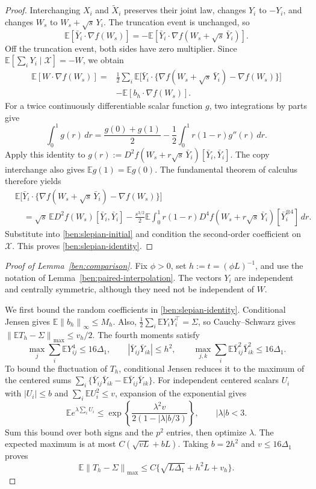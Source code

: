 \documentclass[11pt,letterpaper]{article}
\newenvironment{recovered}{\color{magenta}}{}
\theoremstyle{remark}
\newcommand{\E}{\mathbb E}
\newcommand{\norm}[1]{\left\lVert#1\right\rVert}
\begin{document}
\begin{recovered}
\begin{proof}
Interchanging \(X_i\) and \(\widetilde X_i\) preserves their joint
law, changes \(Y_i\) to \(-Y_i\), and changes \(W_s\) to
\(W_s+\sqrt s\,Y_i\). The truncation event is unchanged, so
\[
 \E[\bar Y_i\cdot\nabla f(W_s)]
 =-\E[\bar Y_i\cdot\nabla f(W_s+\sqrt s\,\bar Y_i)].
\]
Off the truncation event, both sides have zero multiplier. Since
\(\E[\sum_iY_i\mid\mathcal X]=-W\), we obtain
\begin{align*}
 \E[W\cdot\nabla f(W_s)]
 ={}&\frac12\sum_i\E\big[\bar Y_i\cdot
       \{\nabla f(W_s+\sqrt s\,\bar Y_i)-\nabla f(W_s)\}\big]\\
 &-\E[b_h\cdot\nabla f(W_s)].
\end{align*}
For a twice continuously differentiable scalar function \(g\),
two integrations by parts give
\[
 \int_0^1g(r)\,dr
 =\frac{g(0)+g(1)}2-\frac12\int_0^1r(1-r)g''(r)\,dr.
\]
Apply this identity to
\(g(r):=D^2f(W_s+r\sqrt s\,\bar Y_i)[\bar Y_i,\bar Y_i]\).
The copy interchange also gives \(\E g(1)=\E g(0)\).
The fundamental theorem of calculus therefore yields
\begin{align*}
 &\E\big[\bar Y_i\cdot
   \{\nabla f(W_s+\sqrt s\,\bar Y_i)-\nabla f(W_s)\}\big]\\
 &\quad=\sqrt s\,\E D^2f(W_s)[\bar Y_i,\bar Y_i]
 -\frac{s^{3/2}}2\E\int_0^1r(1-r)
       D^4f(W_s+r\sqrt s\,\bar Y_i)[\bar Y_i^{\otimes4}]\,dr.
\end{align*}
Substitute into \eqref{ben:slepian-initial} and condition the
second-order coefficient on \(\mathcal X\). This proves
\eqref{ben:slepian-identity}.
\end{proof}

\begin{proof}[Proof of Lemma~\ref{ben:comparison}]
Fix \(\phi>0\), set \(h:=t=(\phi L)^{-1}\), and use the
notation of Lemma~\ref{ben:paired-interpolation}. The vectors
\(Y_i\) are independent and centrally symmetric, although they
need not be independent of \(W\).

We first bound the random coefficients in
\eqref{ben:slepian-identity}. Conditional Jensen gives
\(\E\norm{b_h}_\infty\le M_h\). Also,
\(\frac12\sum_i\E Y_iY_i^\top=\Sigma\), so Cauchy--Schwarz
gives \(\norm{\E T_h-\Sigma}_{\max}\le v_h/2\).
The fourth moments satisfy
\[
 \max_j\sum_i\E Y_{ij}^4\le16\Delta_1,\qquad
 |\bar Y_{ij}\bar Y_{ik}|\le h^2,\qquad
 \max_{j,k}\sum_i\E\bar Y_{ij}^2\bar Y_{ik}^2\le16\Delta_1.
\]
To bound the fluctuation of \(T_h\), conditional Jensen reduces it
to the maximum of the centered sums
\(\sum_i\{\bar Y_{ij}\bar Y_{ik}-\E\bar Y_{ij}\bar Y_{ik}\}\).
For independent centered scalars \(U_i\) with \(|U_i|\le b\)
and \(\sum_i\E U_i^2\le v\), expansion of the exponential gives
\[
 \E e^{\lambda\sum_iU_i}
 \le\exp\!\left\{\frac{\lambda^2v}{2(1-|\lambda|b/3)}\right\},
 \qquad |\lambda|b<3.
\]
Sum this bound over both signs and the \(p^2\) entries, then
optimize \(\lambda\). The expected maximum is at most
\(C(\sqrt{vL}+bL)\). Taking \(b=2h^2\) and
\(v\le16\Delta_1\) proves
\begin{equation}\label{ben:conditional-matrix}
 \E\norm{T_h-\Sigma}_{\max}
 \le C\{\sqrt{L\Delta_1}+h^2L+v_h\}.
\end{equation}


\end{proof}
\end{recovered}
\end{document}
